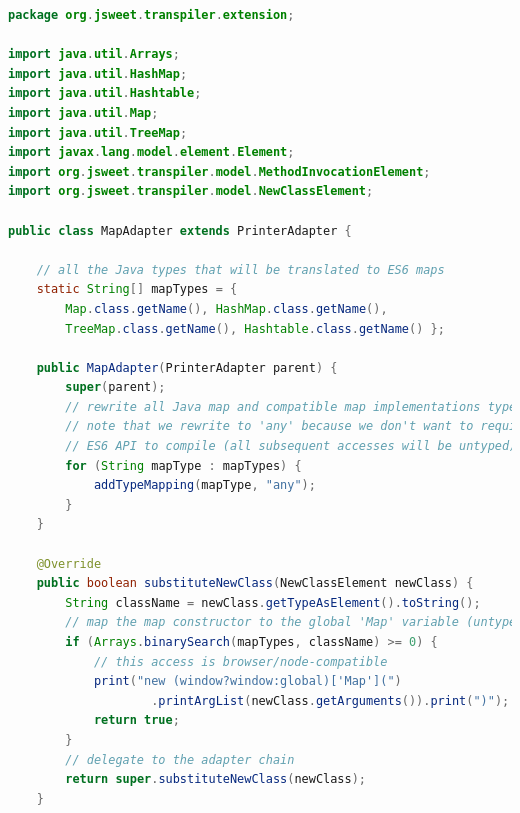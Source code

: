 \documentclass[a4paper]{report}
\begin{document}
\begin{lstlisting}[language=Java]
package org.jsweet.transpiler.extension;

import java.util.Arrays;
import java.util.HashMap;
import java.util.Hashtable;
import java.util.Map;
import java.util.TreeMap;
import javax.lang.model.element.Element;
import org.jsweet.transpiler.model.MethodInvocationElement;
import org.jsweet.transpiler.model.NewClassElement;

public class MapAdapter extends PrinterAdapter {

	// all the Java types that will be translated to ES6 maps
	static String[] mapTypes = { 
		Map.class.getName(), HashMap.class.getName(), 
		TreeMap.class.getName(), Hashtable.class.getName() };

	public MapAdapter(PrinterAdapter parent) {
		super(parent);
		// rewrite all Java map and compatible map implementations types
		// note that we rewrite to 'any' because we don't want to require the
		// ES6 API to compile (all subsequent accesses will be untyped)
		for (String mapType : mapTypes) {
			addTypeMapping(mapType, "any");
		}
	}

	@Override
	public boolean substituteNewClass(NewClassElement newClass) {
		String className = newClass.getTypeAsElement().toString();
		// map the map constructor to the global 'Map' variable (untyped access)
		if (Arrays.binarySearch(mapTypes, className) >= 0) {
			// this access is browser/node-compatible
			print("new (window?window:global)['Map'](")
					.printArgList(newClass.getArguments()).print(")");
			return true;
		}
		// delegate to the adapter chain
		return super.substituteNewClass(newClass);
	}


\end{lstlisting}
\end{document}
